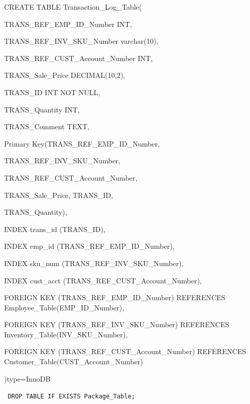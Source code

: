 \documentclass{report}
\begin{document}
\begin{itemize}
{        CREATE TABLE Transaction\_Log\_Table(
        \begin{list}{}
            \item{TRANS\_REF\_EMP\_ID\_Number                 INT,}
            \item{TRANS\_REF\_INV\_SKU\_Number                varchar(10),}
            \item{TRANS\_REF\_CUST\_Account\_Number           INT,}
            \item{TRANS\_Sale\_Price                        DECIMAL(10,2),}
            \item{TRANS\_ID                                INT NOT NULL,}
            \item{TRANS\_Quantity                          INT,}
            \item{TRANS\_Comment                           TEXT,}
            \item{Primary Key(TRANS\_REF\_EMP\_ID\_Number,}
            \begin{list}{}
                \item{TRANS\_REF\_INV\_SKU\_Number,}
                \item{TRANS\_REF\_CUST\_Account\_Number,}
                \item{TRANS\_Sale\_Price, TRANS\_ID,}
                \item{TRANS\_Quantity),}
            \end{list}
            \item{INDEX trans\_id (TRANS\_ID),}
            \item{INDEX emp\_id (TRANS\_REF\_EMP\_ID\_Number),}
            \item{INDEX sku\_num (TRANS\_REF\_INV\_SKU\_Number),}
            \item{INDEX cust\_acct (TRANS\_REF\_CUST\_Account\_Number),}
            \item{FOREIGN KEY (TRANS\_REF\_EMP\_ID\_Number) REFERENCES Employee\_Table(EMP\_ID\_Number),}
            \item{FOREIGN KEY (TRANS\_REF\_INV\_SKU\_Number) REFERENCES Inventory\_Table(INV\_SKU\_Number),}
            \item{FOREIGN KEY (TRANS\_REF\_CUST\_Account\_Number) REFERENCES Customer\_Table(CUST\_Account\_Number)}
        \end{list}
        )type=InnoDB\\
        }

        {\tt\small
        DROP TABLE IF EXISTS Package\_Table;\\

}
\end{itemize}
\end{document}
